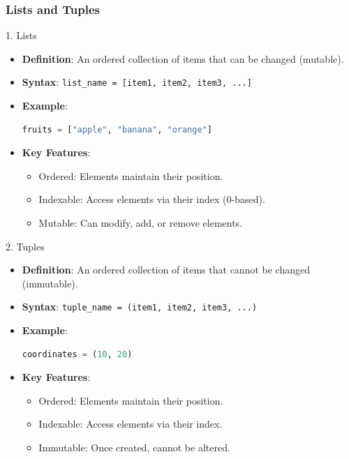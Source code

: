 \documentclass{beamer}
\begin{document}
\begin{frame}[fragile]
    \frametitle{Lists and Tuples}
    \begin{block}{1. Lists}
        \begin{itemize}
            \item \textbf{Definition}: An ordered collection of items that can be changed (mutable).
            \item \textbf{Syntax}: \texttt{list\_name = [item1, item2, item3, ...]}
            \item \textbf{Example}:
            \begin{lstlisting}[language=Python]
fruits = ["apple", "banana", "orange"]
            \end{lstlisting}
            \item \textbf{Key Features}:
            \begin{itemize}
                \item Ordered: Elements maintain their position.
                \item Indexable: Access elements via their index (0-based).
                \item Mutable: Can modify, add, or remove elements.
            \end{itemize}
        \end{itemize}
    \end{block}
    
    \begin{block}{2. Tuples}
        \begin{itemize}
            \item \textbf{Definition}: An ordered collection of items that cannot be changed (immutable).
            \item \textbf{Syntax}: \texttt{tuple\_name = (item1, item2, item3, ...)}
            \item \textbf{Example}:
            \begin{lstlisting}[language=Python]
coordinates = (10, 20)
            \end{lstlisting}
            \item \textbf{Key Features}:
            \begin{itemize}
                \item Ordered: Elements maintain their position.
                \item Indexable: Access elements via their index.
                \item Immutable: Once created, cannot be altered.
            \end{itemize}
        \end{itemize}
    \end{block}
\end{frame}
\end{document}
